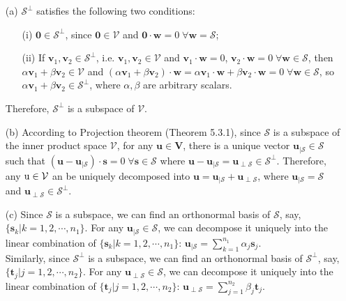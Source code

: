 \documentclass{assignment}
\begin{document}
\begin{sol}
    \begin{itemize}
        \item[(a)] $\mathcal{S}^{\perp}$ satisfies the following two conditions:
        \begin{itemize}
            \item[(i)] $\bm{0}\in\mathcal{S}^{\perp}$, since $\bm{0}\in\mathcal{V}$ and $\bm{0}\cdot\bm{w}=0\;\forall\bm{w}=\mathcal{S}$;
            \item[(ii)] If $\bm{v}_1,\bm{v}_2\in\mathcal{S}^{\perp}$, i.e. $\bm{v}_1,\bm{v}_2\in\mathcal{V}$ and $\bm{v}_1\cdot\bm{w}=0$, $\bm{v}_2\cdot\bm{w}=0\;\forall\bm{w}\in\mathcal{S}$, then $\alpha\bm{v}_1+\beta\bm{v}_2\in\mathcal{V}$ and $(\alpha\bm{v}_1+\beta\bm{v}_2)\cdot\bm{w}=\alpha\bm{v}_1\cdot\bm{w}+\beta\bm{v}_2\cdot\bm{w}=0\;\forall\bm{w}\in\mathcal{S}$, so $\alpha\bm{v}_1+\beta\bm{v}_2\in\mathcal{S}^{\perp}$, where $\alpha,\beta$ are arbitrary scalars.
        \end{itemize}
        Therefore, $\mathcal{S}^{\perp}$ is a subspace of $\mathcal{V}$.
        \item[(b)] According to Projection theorem (Theorem 5.3.1), since $\mathcal{S}$ is a subspace of the inner product space $\mathcal{V}$, for any $\bm{u}\in\bm{V}$, there is a unique vector $\bm{u}_{\vert\mathcal{S}}\in\mathcal{S}$ such that $(\bm{u}-\bm{u}_{\vert\mathcal{S}})\cdot\bm{s}=0\;\forall\bm{s}\in\mathcal{S}$ where $\bm{u}-\bm{u}_{\vert\mathcal{S}}=\bm{u}_{\perp\mathcal{S}}\in\mathcal{S}^{\perp}$. Therefore, any $\rm{u}\in\mathcal{V}$ an be uniquely decomposed into $\bm{u}=\bm{u}_{\vert\mathcal{S}}+\bm{u}_{\perp\mathcal{S}}$, where $\bm{u}_{\vert\mathcal{S}}=\mathcal{S}$ and $\bm{u}_{\perp\mathcal{S}}\in\mathcal{S}^{\perp}$.
        \item[(c)] Since $\mathcal{S}$ is a subspace, we can find an orthonormal basis of $\mathcal{S}$, say, $\{\bm{s}_k\vert k=1,2,\cdots,n_1\}$. For any $\bm{u}_{\vert\mathcal{S}}\in\mathcal{S}$, we can decompose it uniquely into the linear combination of $\{\bm{s}_k\vert k=1,2,\cdots,n_1\}$: $\bm{u}_{\vert\mathcal{S}}=\sum_{k=1}^{n_1}\alpha_j\bm{s}_j$.\\
        Similarly, since $\mathcal{S}^{\perp}$ is a subspace, we can find an orthonormal basis of $\mathcal{S}^{\perp}$, say, $\{\bm{t}_j\vert j=1,2,\cdots,n_2\}$. For any $\bm{u}_{\perp\mathcal{S}}\in\mathcal{S}$, we can decompose it uniquely into the linear combination of $\{\bm{t}_j\vert j=1,2,\cdots,n_2\}$: $\bm{u}_{\perp\mathcal{S}}=\sum_{j=1}^{n_2}\beta_j\bm{t}_j$.\\

\end{itemize}
\end{sol}
\end{document}
